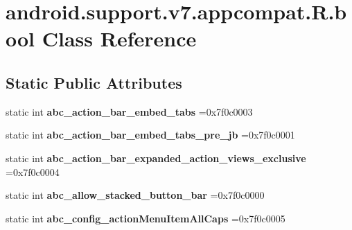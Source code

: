 \hypertarget{classandroid_1_1support_1_1v7_1_1appcompat_1_1R_1_1bool}{}\section{android.\+support.\+v7.\+appcompat.\+R.\+bool Class Reference}
\label{classandroid_1_1support_1_1v7_1_1appcompat_1_1R_1_1bool}
\subsection*{Static Public Attributes}
\begin{DoxyCompactItemize}
\item 
\mbox{\label{classandroid_1_1support_1_1v7_1_1appcompat_1_1R_1_1bool_a759124dfbdffbcc4b81a010d85cafbd5}} 
static int {\bfseries abc\+\_\+action\+\_\+bar\+\_\+embed\+\_\+tabs} =0x7f0c0003
\item 
\mbox{\label{classandroid_1_1support_1_1v7_1_1appcompat_1_1R_1_1bool_acca9d0a01c14397a11bd7e55f2d4cede}} 
static int {\bfseries abc\+\_\+action\+\_\+bar\+\_\+embed\+\_\+tabs\+\_\+pre\+\_\+jb} =0x7f0c0001
\item 
\mbox{\label{classandroid_1_1support_1_1v7_1_1appcompat_1_1R_1_1bool_aa57c8845474e2cb4f1d081895f1476d6}} 
static int {\bfseries abc\+\_\+action\+\_\+bar\+\_\+expanded\+\_\+action\+\_\+views\+\_\+exclusive} =0x7f0c0004
\item 
\mbox{\label{classandroid_1_1support_1_1v7_1_1appcompat_1_1R_1_1bool_a551ed2255d3cdf00aceb55b7ad66b299}} 
static int {\bfseries abc\+\_\+allow\+\_\+stacked\+\_\+button\+\_\+bar} =0x7f0c0000
\item 
\mbox{\label{classandroid_1_1support_1_1v7_1_1appcompat_1_1R_1_1bool_abddae922fc9b45ba883b509b34203f79}} 
static int {\bfseries abc\+\_\+config\+\_\+action\+Menu\+Item\+All\+Caps} =0x7f0c0005
\item 
\mbox{\label{classandroid_1_1support_1_1v7_1_1appcompat_1_1R_1_1bool_a30c139e76ad4b69b1affa03332ddaca0}} 

\end{DoxyCompactItemize}
